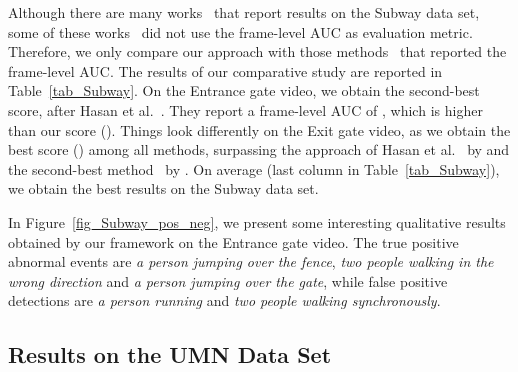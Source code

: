 \documentclass[10pt,twocolumn,letterpaper]{article}
\begin{document}
Although there are many works~\cite{Cheng-CVPR-2015,Cong-CVPR-2011,Giorno-ECCV-2016,Dutta-AAAI-2015,Hasan-CVPR-2016,Ionescu-ICCV-2017,Lu-ICCV-2013,Saligrama-CVPR-2012,Zhang-PR-2016} that report results on the Subway data set, some of these works~\cite{Dutta-AAAI-2015,Lu-ICCV-2013,Zhang-PR-2016} did not use the frame-level AUC as evaluation metric. Therefore, we only compare our approach with those methods~\cite{Cheng-CVPR-2015,Cong-CVPR-2011,Giorno-ECCV-2016,Hasan-CVPR-2016,Ionescu-ICCV-2017,Saligrama-CVPR-2012} that reported the frame-level AUC. The results of our comparative study are reported in Table~\ref{tab_Subway}. On the Entrance gate video, we obtain the second-best score, after Hasan et al.~\cite{Hasan-CVPR-2016}. They report a frame-level AUC of , which is  higher than our score (). Things look differently on the Exit gate video, as we obtain the best score () among all methods, surpassing the approach of Hasan et al.~\cite{Hasan-CVPR-2016} by  and the second-best method~\cite{Ionescu-ICCV-2017} by . On average (last column in Table~\ref{tab_Subway}), we obtain the best results on the Subway data set.

In Figure~\ref{fig_Subway_pos_neg}, we present some interesting qualitative results obtained by our framework on the Entrance gate video. The true positive abnormal events are \emph{a person jumping over the fence}, \emph{two people walking in the wrong direction} and \emph{a person jumping over the gate}, while false positive detections are \emph{a person running} and \emph{two people walking synchronously}. 

\vspace*{-0.1cm}
\subsection{Results on the UMN Data Set}
\vspace*{-0.1cm}
\end{document}
